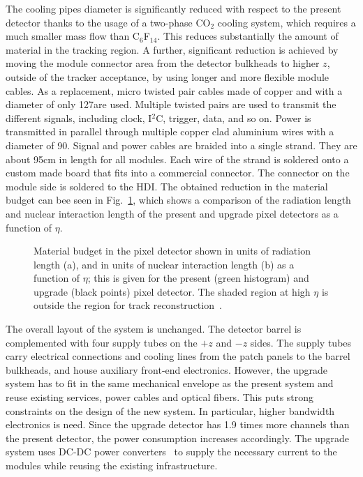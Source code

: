The cooling pipes diameter is significantly reduced with respect to the present detector thanks to the usage of a two-phase CO$_2$ cooling system, which requires a much smaller mass flow than C$_6$F$_{14}$.
This reduces substantially the amount of material in the tracking region. A further, significant reduction is achieved by moving the module connector area from the detector bulkheads to higher $z$, outside of the tracker acceptance, by using longer and more flexible module cables. As a replacement, micro twisted pair cables made of copper and with a diameter of only 127\mum  are used.
Multiple twisted pairs are used to transmit the different signals, including clock, I$^2$C, trigger, data, and so on. Power is transmitted in parallel through multiple copper clad aluminium wires with a diameter of 90\mum. Signal and power cables are braided into a single strand. They are about 95\unit{cm} in length for all modules. Each wire of the strand is soldered onto a custom made board that fits into a commercial connector. The connector on the module side is soldered to the HDI.
The obtained reduction in the material budget can bee seen in Fig.~\ref{fig:Phase1Budget}, which shows a comparison of the radiation length and nuclear interaction length of the present and upgrade pixel detectors as a function of $\eta$.

\begin{figure}[!htb]
 \begin{center}
 \end{center}
 \caption{Material budget in the pixel detector shown in units of radiation length (a), and in units of nuclear interaction length (b) as a function of $\eta$; this is given for the present (green histogram) and upgrade (black points) pixel detector. The shaded region at high $\eta$ is outside the region for track reconstruction~\cite{Dominguez:1481838}.}
 \label{fig:Phase1Budget}
\end{figure}

The overall layout of the system is unchanged. The detector barrel is complemented with four supply tubes on the $+z$ and $-z$ sides. The supply tubes carry electrical connections and cooling lines from the patch panels to the barrel bulkheads, and house auxiliary front-end electronics. However, the upgrade system has to fit in the same mechanical envelope as the present system and reuse existing services, power cables and optical fibers. This puts strong constraints on the design of the new system. In particular, higher bandwidth electronics is need. Since the upgrade detector has 1.9 times more channels than the present detector, the power consumption increases accordingly. The upgrade system uses DC-DC power converters~\cite{1748-0221-10-01-C01052} to supply the necessary current to the modules while reusing the existing infrastructure.

